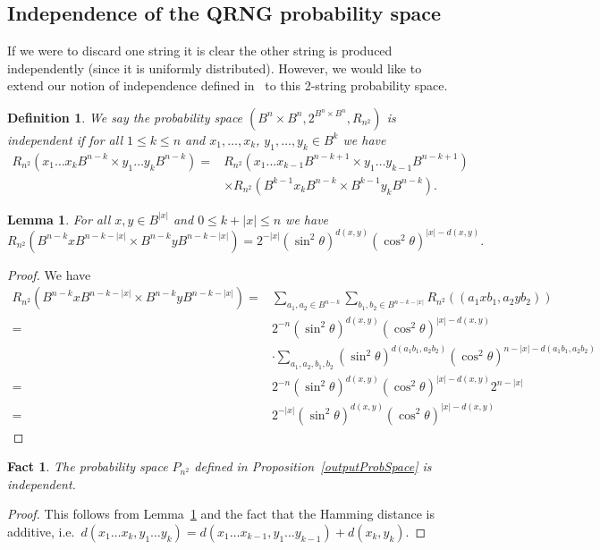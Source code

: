 \documentclass{mscs}
\newtheorem{Fact}[Theorem]{Fact}
\newtheorem{Lemma}[Theorem]{Lemma}
\newtheorem{Definition}[Theorem]{Definition}
\begin{document}
\subsection{Independence of the QRNG probability space}
If we were to discard one string it is clear the other string is produced independently (since it is uniformly distributed). However, we would like to extend our notion of independence defined in~\citep{AbbottCalude10} to this 2-string probability space.

\begin{Definition}\label{defn:independence}
	We say the probability space $(B^n\times B^n,2^{B^n\times B^n},R_{n^2})$ is independent if for all $1\le k \le n$ and $x_1,\dots,x_k$, $y_1,\dots,y_k \in B^k$ we have
	\begin{align*}
		R_{n^2}(x_1\dots x_k B^{n-k} \times y_1\dots y_k B^{n-k})=&R_{n^2}(x_1\dots x_{k-1} B^{n-k+1} \times y_1\dots y_{k-1} B^{n-k+1})\\
		&\times R_{n^2}(B^{k-1}x_k B^{n-k} \times B^{k-1} y_k B^{n-k}).
	\end{align*}
\end{Definition}

\begin{Lemma}\label{independenceLemma}%
	For all $x,y \in B^{|x|}$ and $0\le k + |x| \le n$ we have $$R_{n^2}(B^{n-k}xB^{n-k-|x|} \times B^{n-k}yB^{n-k-|x|}) = 2^{-|x|}(\sin^2\theta)^{d(x,y)}(\cos^2\theta)^{|x|-d(x,y)}.$$
\end{Lemma}
\begin{proof}
	We have
	\begin{align*}
		R_{n^2}(B^{n-k}xB^{n-k-|x|} \times B^{n-k}yB^{n-k-|x|}) =& \sum_{a_1,a_2 \in B^{n-k}}\sum_{b_1,b_2\in B^{n-k-|x|}}R_{n^2}\left((a_1 x b_1,a_2 y b_2) \right)\\
		=& 2^{-n}(\sin^2\theta)^{d(x,y)}(\cos^2\theta)^{|x|-d(x,y)}\\&\cdot\sum_{a_1,a_2,b_1,b_2}(\sin^2\theta)^{d(a_1b_1,a_2b_2)}(\cos^2\theta)^{n-|x| -d(a_1b_1,a_2b_2)}\\
		=& 2^{-n}(\sin^2\theta)^{d(x,y)}(\cos^2\theta)^{|x|-d(x,y)}2^{n-|x|}\\
		=& 2^{-|x|}(\sin^2\theta)^{d(x,y)}(\cos^2\theta)^{|x|-d(x,y)}
	\end{align*}
\end{proof}

\begin{Fact}%
	The probability space $P_{n^2}$  defined in Proposition~\ref{outputProbSpace} is independent.
\end{Fact}
\begin{proof}
	This follows from Lemma~\ref{independenceLemma} and the fact that the Hamming distance is additive, i.e.\ $d(x_1\dots x_k, y_1\dots y_k)=d(x_1\dots x_{k-1},y_1\dots y_{k-1})+d(x_k,y_k)$.
\end{proof}
\end{document}
